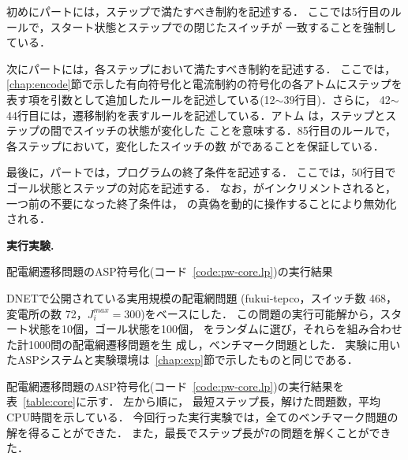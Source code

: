 初めにパートには，ステップで満たすべき制約を記述する．
ここでは5行目のルールで，スタート状態とステップでの閉じたスイッチが
一致することを強制している．

次にパートには，各ステップにおいて満たすべき制約を記述する．
ここでは，\ref{chap:encode}節で示した有向符号化と電流制約の符号化の各アトムにステップを
表す項を引数として追加したルールを記述している(12$\sim$39行目)．さらに，
42$\sim$44行目には，遷移制約を表すルールを記述している．アトム
は，ステップとステップの間でスイッチの状態が変化した
ことを意味する．85行目のルールで，各ステップにおいて，変化したスイッチの数
がであることを保証している．

最後に，パートでは，プログラムの終了条件を記述する．
ここでは，50行目でゴール状態とステップの対応を記述する．
なお，がインクリメントされると，一つ前の不要になった終了条件は，
の真偽を動的に操作することにより無効化される．

\textbf{実行実験.}
\begin{table*}[t]
  \centering
  \caption{配電網遷移問題のASP符号化(コード~\ref{code:pw-core.lp})の実行結果}
  \label{table:core}
  
\end{table*}
%
DNETで公開されている実用規模の配電網問題
({\sf fukui-tepco}，スイッチ数 468，変電所の数 72，$J_i^{max}=300$)をベースにした．
この問題の実行可能解から，スタート状態を10個，ゴール状態を100個，
をランダムに選び，それらを組み合わせた計1000問の配電網遷移問題を生
成し，ベンチマーク問題とした．
実験に用いたASPシステムと実験環境は~\ref{chap:exp}節で示したものと同じである．

配電網遷移問題のASP符号化(コード~\ref{code:pw-core.lp})の実行結果を
表~\ref{table:core}に示す．
左から順に，
最短ステップ長，解けた問題数，平均CPU時間を示している．
今回行った実行実験では，全てのベンチマーク問題の解を得ることができた．
また，最長でステップ長が7の問題を解くことができた．



